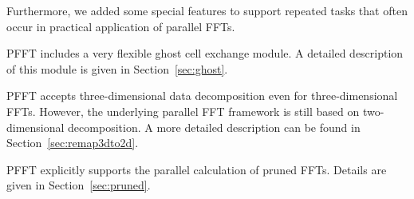 Furthermore, we added some special features to support repeated tasks that often occur in practical application of parallel FFTs.
\begin{compactitem}
  \item PFFT includes a very flexible ghost cell exchange module. A detailed description of this module is given in Section~\ref{sec:ghost}.
  \item PFFT accepts three-dimensional data decomposition even for three-dimen\-sional FFTs.
        However, the underlying parallel FFT framework is still based on two-dimensional decomposition. A more detailed description can be found
        in Section~\ref{sec:remap3dto2d}.
  \item PFFT explicitly supports the parallel calculation of pruned FFTs. Details are given in Section~\ref{sec:pruned}.
\end{compactitem}

